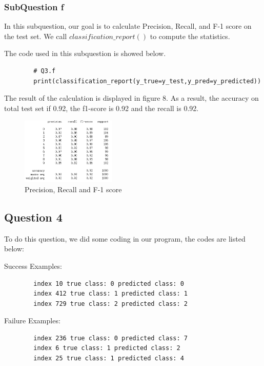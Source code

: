 \documentclass[conference]{IEEEtran}
\begin{document}
	\subsubsection{SubQuestion f}
	In this subquestion, our goal is to calculate Precision, Recall, and F-1 score on the test set. We call $classification\_report()$ to compute the statistics. \par
	
	The code used in this subquestion is showed below. \par
	
	
	
	\begin{lstlisting}
		# Q3.f
		print(classification_report(y_true=y_test,y_pred=y_predicted))
	\end{lstlisting} \par
	The result of the calculation is displayed in figure 8. As a result, the accuracy on total test set if 0.92, the f1-score is 0.92 and the recall is 0.92.
	\begin{figure}[h] 
		\centering
		\includegraphics[width=0.4\textwidth]{T1Q3f.png}
		\caption{Precision, Recall and F-1 score}
		\label{Fig.t1q3f}
	\end{figure}
	\subsection{Question 4}
	To do this question, we did some coding in our program, the codes are listed below:
	
	Success Examples:
	\begin{lstlisting}
		index 10 true class: 0 predicted class: 0
		index 412 true class: 1 predicted class: 1
		index 729 true class: 2 predicted class: 2
	\end{lstlisting}
	Failure Examples:
	\begin{lstlisting}
		index 236 true class: 0 predicted class: 7
		index 6 true class: 1 predicted class: 2
		index 25 true class: 1 predicted class: 4
	\end{lstlisting}
	
\end{document}
